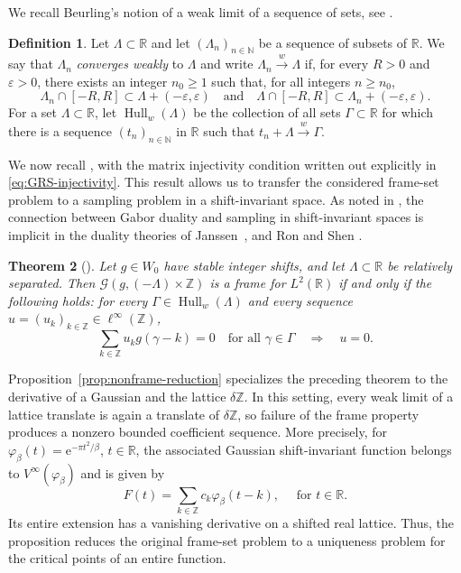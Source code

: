 \documentclass[11pt]{amsart}
\numberwithin{equation}{section}
\newtheorem{theorem}{Theorem}[section]
\theoremstyle{definition}
\newtheorem{definition}[theorem]{Definition}
\theoremstyle{remark}
\newcommand{\R}{\mathbb R}
\newcommand{\Z}{\mathbb Z}
\newcommand{\N}{\mathbb N}
\newcommand{\e}{\mathrm e}
\newcommand{\cG}{\mathcal G}
\newcommand{\Hullw}{\operatorname{Hull}_{w}}
\begin{document}
We recall Beurling's notion of a weak limit of a sequence of sets, see \cite{GRSsampling}.
\begin{definition}
    Let $\Lambda\subset\R$ and let $(\Lambda_n)_{n \in \N}$ be a sequence of subsets of $\R$. We say that $\Lambda_n$ \emph{converges weakly} to $\Lambda$ and write $\Lambda_n\xrightarrow{w}\Lambda$ if, for every $R>0$ and $\varepsilon>0$, there exists an integer $n_0\geq1$ such that, for all integers $n\geq n_0$,
    \begin{equation}
        \Lambda_n\cap[-R,R]
        \subset \Lambda+(-\varepsilon,\varepsilon)
        \quad\text{and}\quad
        \Lambda\cap[-R,R]
        \subset \Lambda_n+(-\varepsilon,\varepsilon).
    \end{equation}
    For a set $\Lambda\subset\R$, let $\Hullw(\Lambda)$ be the collection of all sets $\Gamma\subset\R$ for which there is a sequence $(t_n)_{n \in \N}$ in $\R$ such that $t_n+\Lambda\xrightarrow{w}\Gamma$.
\end{definition}

We now recall \cite[Theorem~3.3]{GRSsampling}, with the matrix injectivity condition written out explicitly in \eqref{eq:GRS-injectivity}. This result allows us to transfer the considered frame-set problem to a sampling problem in a shift-invariant space. As noted in \cite[Sec.~2.3]{GRSsampling}, the connection between Gabor duality and sampling in shift-invariant spaces is implicit in the duality theories of Janssen~\cite{Janssen1995}, and Ron and Shen \cite{RonShen1997}.

\begin{theorem}[{\cite[Theorem~3.3]{GRSsampling}}]\label{thm:GRS-frame}
    Let $g\in W_0$ have stable integer shifts, and let $\Lambda\subset\R$ be relatively separated. Then $\cG(g,(-\Lambda) \times \Z)$ is a frame for $L^2(\R)$ if and only if the following holds: for every $\Gamma\in\Hullw(\Lambda)$ and every sequence $u=(u_k)_{k\in\Z}\in\ell^\infty(\Z)$,
    \begin{equation}\label{eq:GRS-injectivity}
        \sum_{k\in\Z}u_k g(\gamma-k)=0
        \quad\text{for all }\gamma\in\Gamma
        \quad\Longrightarrow\quad u=0.
    \end{equation}
\end{theorem}

Proposition~\ref{prop:nonframe-reduction} specializes the preceding theorem to the derivative of a Gaussian and the lattice $\delta\Z$. In this setting, every weak limit of a lattice translate is again a translate of $\delta\Z$, so failure of the frame property produces a nonzero bounded coefficient sequence. More precisely, for $\varphi_\beta(t)=\e^{-\pi t^2/\beta}$, $t \in \R$, the associated Gaussian shift-invariant function belongs to $V^\infty(\varphi_\beta)$ and is given by
\begin{equation}
    F(t)=\sum_{k\in\Z}c_k\varphi_\beta(t-k),
    \quad  \text{ for } t\in\R.
\end{equation}
Its entire extension has a vanishing derivative on a shifted real lattice. Thus, the proposition reduces the original frame-set problem to a uniqueness problem for the critical points of an entire function.
\end{document}
